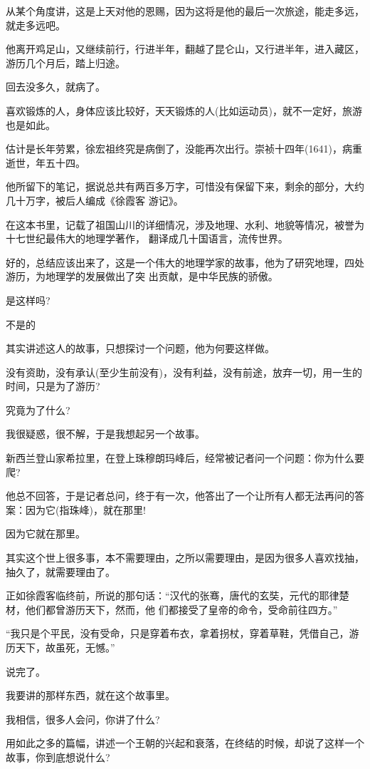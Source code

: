\documentclass[11pt,a4paper,onecolumn]{article}
\begin{document}
从某个角度讲，这是上天对他的恩赐，因为这将是他的最后一次旅途，能走多远，就走多远吧。

他离开鸡足山，又继续前行，行进半年，翻越了昆仑山，又行进半年，进入藏区，游历几个月后，踏上归途。

回去没多久，就病了。

喜欢锻炼的人，身体应该比较好，天天锻炼的人(比如运动员)，就不一定好，旅游也是如此。

估计是长年劳累，徐宏祖终究是病倒了，没能再次出行。崇祯十四年(1641)，病重逝世，年五十四。

他所留下的笔记，据说总共有两百多万字，可惜没有保留下来，剩余的部分，大约几十万字，被后人编成《徐霞客
游记》。

在这本书里，记载了祖国山川的详细情况，涉及地理、水利、地貌等情况，被誉为十七世纪最伟大的地理学著作，
翻译成几十国语言，流传世界。

好的，总结应该出来了，这是一个伟大的地理学家的故事，他为了研究地理，四处游历，为地理学的发展做出了突
出贡献，是中华民族的骄傲。

是这样吗?

不是的

其实讲述这人的故事，只想探讨一个问题，他为何要这样做。

没有资助，没有承认(至少生前没有)，没有利益，没有前途，放弃一切，用一生的时间，只是为了游历?

究竟为了什么?

我很疑惑，很不解，于是我想起另一个故事。

新西兰登山家希拉里，在登上珠穆朗玛峰后，经常被记者问一个问题：你为什么要爬?

他总不回答，于是记者总问，终于有一次，他答出了一个让所有人都无法再问的答案：因为它(指珠峰)，就在那里!

因为它就在那里。

其实这个世上很多事，本不需要理由，之所以需要理由，是因为很多人喜欢找抽，抽久了，就需要理由了。

正如徐霞客临终前，所说的那句话：``汉代的张骞，唐代的玄奘，元代的耶律楚材，他们都曾游历天下，然而，他
们都接受了皇帝的命令，受命前往四方。''

``我只是个平民，没有受命，只是穿着布衣，拿着拐杖，穿着草鞋，凭借自己，游历天下，故虽死，无憾。''

说完了。

我要讲的那样东西，就在这个故事里。

我相信，很多人会问，你讲了什么?

用如此之多的篇幅，讲述一个王朝的兴起和衰落，在终结的时候，却说了这样一个故事，你到底想说什么?
\end{document}
